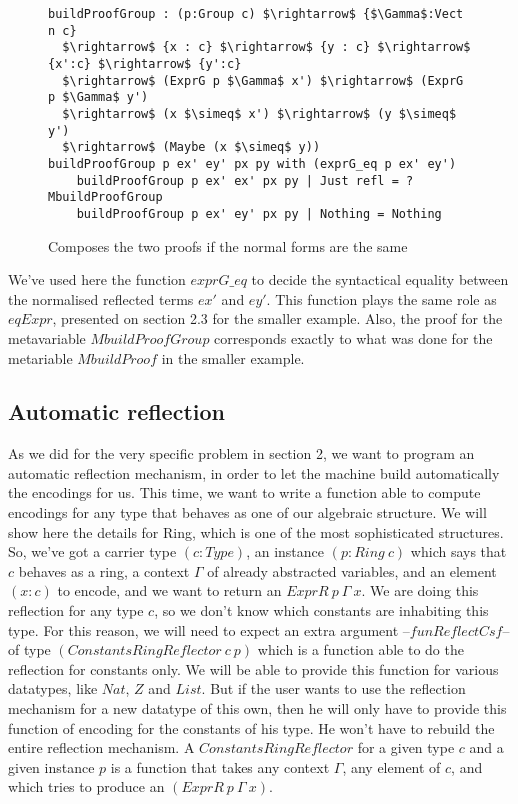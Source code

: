 \begin{figure}[H]
\figrule
\begin{center}
\begin{lstlisting}
buildProofGroup : (p:Group c) $\rightarrow$ {$\Gamma$:Vect n c} 
  $\rightarrow$ {x : c} $\rightarrow$ {y : c} $\rightarrow$ {x':c} $\rightarrow$ {y':c} 
  $\rightarrow$ (ExprG p $\Gamma$ x') $\rightarrow$ (ExprG p $\Gamma$ y') 
  $\rightarrow$ (x $\simeq$ x') $\rightarrow$ (y $\simeq$ y') 
  $\rightarrow$ (Maybe (x $\simeq$ y))
buildProofGroup p ex' ey' px py with (exprG_eq p ex' ey')
    buildProofGroup p ex' ex' px py | Just refl = ?MbuildProofGroup
    buildProofGroup p ex' ey' px py | Nothing = Nothing
\end{lstlisting}
\end{center}
\caption{Composes the two proofs if the normal forms are the same}
\label{buildProofGroup}
\figrule
\end{figure}
We've used here the function $exprG\_eq$ to decide the syntactical equality between the normalised reflected terms $ex'$ and $ey'$. This function plays the same role as $eqExpr$, presented on section 2.3 for the smaller example. Also, the proof for the metavariable $MbuildProofGroup$ corresponds exactly to what was done for the metariable $MbuildProof$ in the smaller example.


\subsection {Automatic reflection}

As we did for the very specific problem in section 2, we want to program an automatic reflection mechanism, in order to let the machine build automatically the encodings for us. This time, we want to write a function able to compute encodings for any type that behaves as one of our algebraic structure. We will show here the details for Ring, which is one of the most sophisticated structures. So, we've got a carrier type $(c:Type)$, an instance $(p:Ring\ c)$ which says that $c$ behaves as a ring, a context $\Gamma$ of already abstracted variables, and an element $(x:c)$ to encode, and we want to return an $ExprR\ p\ \Gamma\ x$.
We are doing this reflection for any type $c$, so we don't know which constants are inhabiting this type. For this reason, we will need to expect an extra argument --$funReflectCsf$-- of type $(ConstantsRingReflector\ c\ p)$ which is a function able to do the reflection for constants only. We will be able to provide this function for various datatypes, like $Nat$, $Z$ and $List$. But if the user wants to use the reflection mechanism for a new datatype of this own, then he will only have to provide this function of encoding for the constants of his type. He won't have to rebuild the entire reflection mechanism.
A $ConstantsRingReflector$ for a given type $c$ and a given instance $p$ is a function that takes any context $\Gamma$, any element of $c$, and which tries to produce an $(ExprR\ p\ \Gamma\ x)$.

